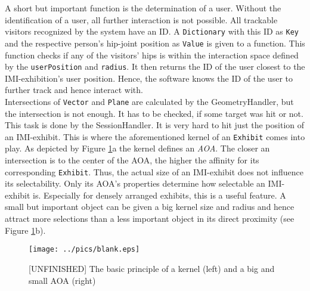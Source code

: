 A short but important function is the determination of a user. Without the identification of a user, all further interaction is not possible. All trackable visitors recognized by the system have an \ac{ID}. A \texttt{Dictionary} with this \ac{ID} as \texttt{Key} and the respective person's hip-joint position as \texttt{Value} is given to a function. This function checks if any of the visitors' hips is within the interaction space defined by the \texttt{userPosition} and \texttt{radius}. It then returns the \ac{ID} of the user closest to the \ac{IMI}-exhibition's user position. Hence, the software knows the \ac{ID} of the user to further track and hence interact with.
\\
Intersections of \texttt{Vector} and \texttt{Plane} are calculated by the GeometryHandler, but the intersection is not enough. It has to be checked, if some target was hit or not. This task is done by the SessionHandler. It is very hard to hit just the position of an \ac{IMI}-exhibit. This is where the aforementioned kernel of an \texttt{Exhibit} comes into play. As depicted by Figure \ref{fig:exhibit_kernel}a the kernel defines an \textit{\ac{AOA}}. The closer an intersection is to the center of the \ac{AOA}, the higher the affinity for its corresponding \texttt{Exhibit}. Thus, the actual size of an \ac{IMI}-exhibit does not influence its selectability. Only its \ac{AOA}'s properties determine how selectable an \ac{IMI}-exhibit is. Especially for densely arranged exhibits, this is a useful feature. A small but important object can be given a big kernel size and radius and hence attract more selections than a less important object in its direct proximity (see Figure \ref{fig:exhibit_kernel}b).
\begin{figure}[H]%
\texttt{[image: ../pics/blank.eps]}%
\caption{[UNFINISHED] The basic principle of a kernel (left) and a big and small AOA (right)}%
\label{fig:exhibit_kernel} %
\end{figure}

